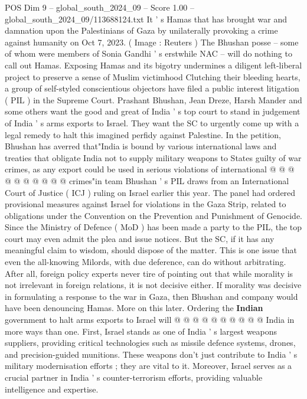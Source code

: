 \begin{textsample}{POS Dim 9 – global\_south\_2024\_09 – Score 1.00 – global\_south\_2024\_09/113688124.txt}  \label{ex:f9_pos_344}
It ' s Hamas that has brought war and damnation upon the Palestinians of Gaza by unilaterally provoking a crime against humanity on Oct 7, 2023. ( Image : Reuters ) The Bhushan posse -- some of whom were members of Sonia Gandhi ' s erstwhile NAC -- will do nothing to call out Hamas.
Exposing Hamas and its bigotry undermines a diligent left-liberal project to preserve a sense of Muslim victimhood Clutching their bleeding hearts, a group of self-styled conscientious objectors have filed a public interest litigation ( PIL ) in the Supreme Court.
Prashant Bhushan, Jean Dreze, Harsh Mander and some others want the good and great of India ' s top court to stand in judgement of India ' s arms exports to Israel.
They want the SC to urgently come up with a legal remedy to halt this imagined perfidy against Palestine.
In the petition, Bhushan has averred that"India is bound by various international laws and treaties that obligate India not to supply military weapons to States guilty of war crimes, as any export could be used in serious violations of international @ @ @ @ @ @ @ @ @ @ crimes"in team Bhushan ' s PIL draws from an International Court of Justice ( ICJ ) ruling on Israel earlier this year.
The panel had ordered provisional measures against Israel for violations in the Gaza Strip, related to obligations under the Convention on the Prevention and Punishment of Genocide.
Since the Ministry of Defence ( MoD ) has been made a party to the PIL, the top court may even admit the plea and issue notices.
But the SC, if it has any meaningful claim to wisdom, should dispose of the matter.
This is one issue that even the all-knowing Milords, with due deference, can do without arbitrating.
After all, foreign policy experts never tire of pointing out that while morality is not irrelevant in foreign relations, it is not decisive either.
If morality was decisive in formulating a response to the war in Gaza, then Bhushan and company would have been denouncing Hamas.
More on this later.
Ordering the \textbf{Indian} government to halt arms exports to Israel will @ @ @ @ @ @ @ @ @ @ India in more ways than one.
First, Israel stands as one of India ' s largest weapons suppliers, providing critical technologies such as missile defence systems, drones, and precision-guided munitions.
These weapons don't just contribute to India ' s military modernisation efforts ; they are vital to it.
Moreover, Israel serves as a crucial partner in India ' s counter-terrorism efforts, providing valuable intelligence and expertise.

\end{textsample}

